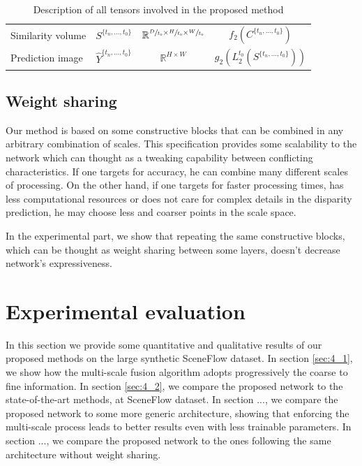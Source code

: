 \documentclass[10pt]{article}
\begin{document}
\begin{table}[]
\begin{tabular}{ l|c|c|c }
    Similarity volume & $S^{ \{ t_n, ... , t_0 \} }$ & $ \mathbb{R}^{ \sfrac{D}{t_0} \times \sfrac{H}{t_0} \times \sfrac{W}{t_0}} $  & $f_2(C^{ \{ t_n, ... , t_0 \} })$ \rule{0pt}{3.5ex} \\
    
    Prediction image & $\hat{Y}^{ \{ t_n, ... , t_0 \} }$ & $\mathbb{R}^{ H \times W}$ & $g_2 (L_2^{t_0}(S^{ \{ t_n, ... , t_0 \} }))$ \rule{0pt}{3.5ex} \\
    \hline
    \end{tabular}
    \caption{Description of all tensors involved in the proposed method}
    \label{tab:entity_description}
\end{table}

\subsection{Weight sharing}

Our method is based on some constructive blocks that can be combined in any arbitrary combination of scales. This specification provides some scalability to the network which can thought as a tweaking capability between conflicting characteristics. If one targets for accuracy, he can combine many different scales of processing. On the other hand, if one targets for faster processing times, has less computational resources or does not care for complex details in the disparity prediction, he may choose less and coarser points in the scale space.

In the experimental part, we show that repeating the same constructive blocks, which can be thought as weight sharing between some layers, doesn't decrease network's expressiveness.

\section{Experimental evaluation}

In this section we provide some quantitative and qualitative results of our proposed methods on the large synthetic SceneFlow dataset. In section \ref{sec:4_1}, we show  how the multi-scale fusion algorithm adopts progressively the coarse to fine information. In section \ref{sec:4_2}, we compare the proposed network to the state-of-the-art methods, at SceneFlow dataset. In section ..., we compare the proposed network to some more generic architecture, showing that enforcing the multi-scale process leads to better results even with less trainable parameters. In section ..., we compare the proposed network to the ones following the same architecture without weight sharing.
\end{document}
